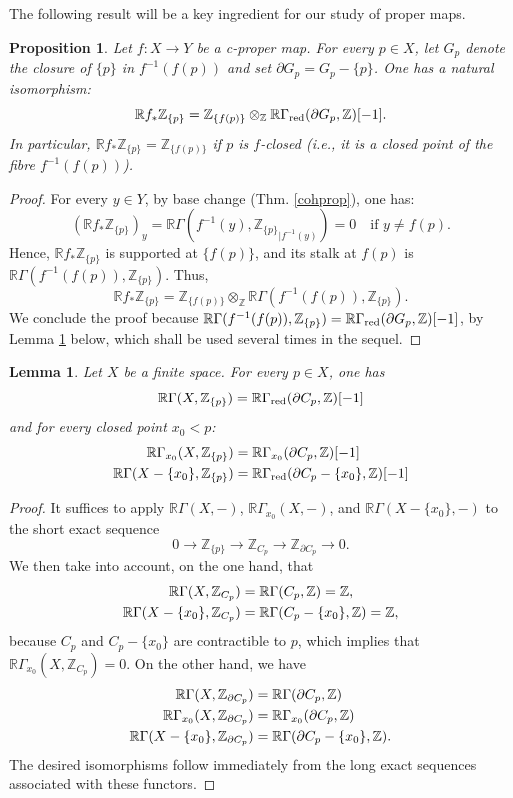 \documentclass[amssymb,amscd,11pt,20pt]{amsart}
\newcommand{\ZZ}{{\mathbb Z}}
\newcommand{\RR}{\mathbb R}
\newcommand{\0}{\mathbf 0}
\theoremstyle{plain}
\newtheorem{lem}[thm]{Lemma}
\newtheorem{prop}[thm]{Proposition}
\numberwithin{equation}{thm}
\begin{document}
The following result will be a key ingredient for our study of proper maps.

\begin{prop}\label{cohpropsup} Let $f\colon X\to Y$ be a c-proper map. For every $p\in X$, let $G_p$ denote   the closure of $\{p\}$ in $f^{-1}(f(p))$ and set $\partial G_p=G_p-\{p\}$. One has a natural isomorphism:
\[\RR f_*\ZZ_{\{p\}} = \ZZ_{\{f(p)\}}\otimes_\ZZ  \RR\Gamma_{\text{\rm red}}(\partial G_p ,\ZZ)[-1].\] 
In particular, $\RR f_*\ZZ_{\{p\}} = \ZZ_{\{f(p)\}}$ if $p$ is $f$-closed (i.e., it is a closed point of the fibre $f^{-1}(f(p))$).
\end{prop}

\begin{proof} For every $y\in Y$, by  base change (Thm. \ref{cohprop}), one has:
\[ (\RR f_*\ZZ_{\{p\}})_y=\RR\Gamma(f^{-1}(y), {\ZZ_{\{p\}}}_{\vert f^{-1}(y)})= 0 \quad \text{if } y\neq f(p).\] Hence, $\RR f_*\ZZ_{\{p\}}$ is supported at $\{f(p)\}$, and its stalk at $f(p)$ is $\RR\Gamma(f^{-1}(f(p)), {\ZZ_{\{p\}}} )$. Thus,
\[ \RR f_*\ZZ_{\{p\}} = \ZZ_{\{f(p)\}}\otimes_\ZZ \RR\Gamma(f^{-1}(f(p)), {\ZZ_{\{p\}}} ).
\]  We conclude the proof because $\RR\Gamma(f^{-1}(f(p)), {\ZZ_{\{p\}}} )= \RR\Gamma_{\text{\rm red}}(\partial G_p  ,\ZZ)[-1]$, by   Lemma \ref{lemma} below, which shall be used several times in the sequel.
\end{proof}

\begin{lem}\label{lemma} Let $X$ be a finite space. For every $p\in X$, one has
\[ \RR\Gamma(X,\ZZ_{\{p\}}) = \RR\Gamma_{\text{\rm red}}(\partial C_p,\ZZ)[-1]\] and for every closed point $x_0< p$:
\[\aligned  \RR\Gamma_{x_0}(X,\ZZ_{\{p\}}) &= \RR\Gamma_{x_0}(\partial C_p,\ZZ)[-1]
\\ \RR\Gamma(X-\{x_0\},\ZZ_{\{p\}}) &= \RR\Gamma_{\text{\rm red}}(\partial C_p-\{x_0\},\ZZ)[-1]
\endaligned\]
\end{lem}

\begin{proof} It suffices to apply $\RR\Gamma(X,-)$, $\RR\Gamma_{x_0}(X,-)$, and $\RR\Gamma(X- \{x_0\},-)$ to the short exact sequence
\[ 0\to\ZZ_{\{p\}}\to \ZZ_{C_p}\to\ZZ_{\partial C_p}\to 0.\] We then take into account, on the one hand, that
\[ \aligned \RR\Gamma(X,\ZZ_{C_p})&= \RR\Gamma(C_p,\ZZ)=\ZZ, 
\\ \RR\Gamma(X-\{x_0\},\ZZ_{C_p})&= \RR\Gamma(C_p-\{x_0\},\ZZ)=\ZZ,
\endaligned\]     because $C_p$ and $ C_p-\{x_0\}$ are contractible to $p$, which implies that
$\RR\Gamma_{x_0}(X ,\ZZ_{C_p})=0$. On the other hand, we have
\[\aligned \RR\Gamma(X,\ZZ_{\partial C_p})&= \RR\Gamma(\partial C_p,\ZZ)
\\ \RR\Gamma_{x_0}(X,\ZZ_{\partial C_p})&= \RR\Gamma_{x_0}(\partial C_p,\ZZ)
\\ \RR\Gamma(X-\{x_0\},\ZZ_{\partial C_p})&= \RR\Gamma(\partial C_p-\{x_0\},\ZZ).\endaligned\]
The desired isomorphisms follow immediately from the long exact sequences associated with these functors.
\end{proof}
\end{document}
